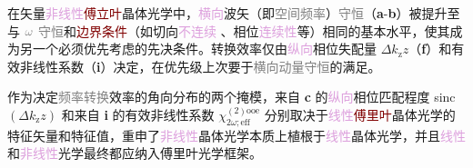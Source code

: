 在矢量\textcolor{Plum}{非线性}\textcolor{Maroon}{傅立叶}\textcolor{PineGreen}{晶体光学}中，\textcolor{Plum}{横向}\textcolor{PineGreen}{波矢}（即\textcolor{gray}{空间频率}）\textcolor{gray}{守恒}（\textbf{a}-\textbf{b}）被提升至与 $\mathcolor{gray}{\omega}$ \textcolor{gray}{守恒}和\textcolor{Maroon}{边界条件}（如切向\textcolor{Plum}{不连续} 、相位\textcolor{Plum}{连续性}等）相同的基本水平，使其成为另一个必须优先考虑的先决条件。转换效率仅由\textcolor{Plum}{纵向}\textcolor{PineGreen}{相位失配量} $\Delta k_\mathrm{z} z$（\textbf{f}）和\textcolor{PineGreen}{有效非线性系数}（\textbf{i}）决定\cite{midwinterEffectsPhaseMatching1965,yaoAccurateCalculationOptimum1992,dmitrievEffectiveNonlinearityCoefficients1993,diesperovEffectiveNonlinearCoefficient1997}，在优先级上次要于\textcolor{gray}{横向动量守恒}的满足。

作为决定\textcolor{gray}{频率转换}效率的角向分布的两个掩模，来自 \textbf{c} 的\textcolor{Plum}{纵向}\textcolor{PineGreen}{相位匹配程度} sinc$(\Delta k_\mathrm{z} z)$ 和来自 \textbf{i} 的\textcolor{PineGreen}{有效非线性系数} $\chi^{(2)\text{ooe}}_{2\omega;\text{eff}}$ 分别取决于\textcolor{Plum}{线性}\textcolor{Maroon}{傅里叶}\textcolor{PineGreen}{晶体光学}的\textcolor{PineGreen}{特征矢量}和\textcolor{PineGreen}{特征值}，重申了\textcolor{Plum}{非线性}\textcolor{PineGreen}{晶体光学}本质上植根于\textcolor{Plum}{线性}\textcolor{PineGreen}{晶体光学}，并且\textcolor{Plum}{线性}和\textcolor{Plum}{非线性}\textcolor{NavyBlue}{光学}最终都应纳入\textcolor{NavyBlue}{傅里叶光学}框架。

